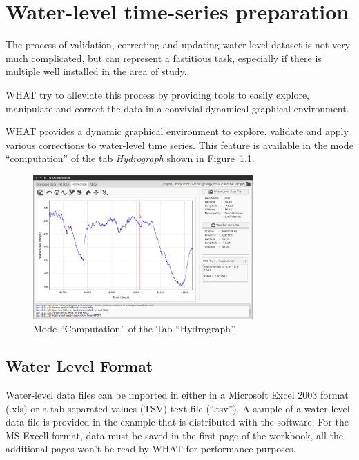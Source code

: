 \documentclass[WHATMANUAL.tex]{subfiles}
\begin{document}
\chapter{Water-level time-series preparation}

The process of validation, correcting and updating water-level dataset is not very much complicated, but can represent a fastitious task, especially if there is multiple well installed in the area of study.

WHAT try to alleviate this process by providing tools to easily explore, manipulate and correct the data in a convivial dynamical graphical environment.

WHAT provides a dynamic graphical environment to explore, validate and apply various corrections to water-level time series. This feature is available in the mode ``computation'' of the tab \emph{Hydrograph} shown in Figure~\ref{fig:tab_hydrograph_computation}.

\begin{figure}[h!]
\centering
\includegraphics[width=0.75\textwidth]{img/WHAT_Screenshot003}
\caption[Mode ``Computation'' of the Tab ``Hydrograph''.]{Mode ``Computation'' of the Tab ``Hydrograph''.}
\label{fig:tab_hydrograph_computation}
\end{figure}

\section{Water Level Format}

Water-level data files can be imported in either in a Microsoft Excel 2003 format (.xls) or a tab-separated values (TSV) text file (``.tsv''). A sample of a water-level data file is provided in the example that is distributed with the software. For the MS Excell format, data must be saved in the first page of the workbook, all the additional pages won't be read by WHAT for performance purposes.
\end{document}
